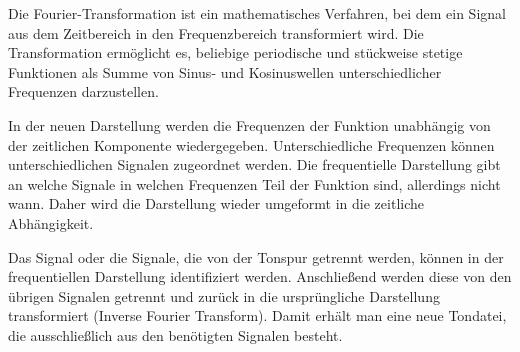 Die Fourier-Transformation ist ein mathematisches Verfahren, bei dem ein Signal aus dem Zeitbereich in den Frequenzbereich transformiert wird. Die Transformation ermöglicht es, beliebige periodische und stückweise stetige Funktionen als Summe von Sinus- und Kosinuswellen unterschiedlicher Frequenzen darzustellen.

\par

 
\par

In der neuen Darstellung werden die Frequenzen der Funktion unabhängig von der zeitlichen Komponente wiedergegeben. Unterschiedliche Frequenzen können unterschiedlichen Signalen zugeordnet werden. Die frequentielle Darstellung gibt an welche Signale in welchen Frequenzen Teil der Funktion sind, allerdings nicht wann. Daher wird die Darstellung wieder umgeformt in die zeitliche Abhängigkeit.

\par

Das Signal oder die Signale, die von der Tonspur getrennt werden, können in der frequentiellen Darstellung identifiziert werden. Anschließend werden diese von den übrigen Signalen getrennt und zurück in die ursprüngliche Darstellung transformiert (Inverse Fourier Transform). Damit erhält man eine neue Tondatei, die ausschließlich aus den benötigten Signalen besteht.








